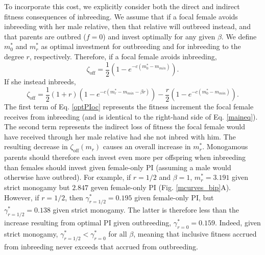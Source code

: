 \documentclass[10pt,letterpaper]{article}
\begin{document}
To incorporate this cost, we explicitly consider both the direct and indirect fitness consequences of inbreeding. We assume that if a focal female avoids inbreeding with her male relative, then that relative will outbreed instead, and that parents are outbred ($f=0$) and invest optimally for any given $\beta$. We define $m^{*}_{0}$ and $m^{*}_{r}$ as optimal investment for outbreeding and for inbreeding to the degree $r$, respectively. Therefore, if a focal female avoids inbreeding,
\begin{equation} \label{optPI}
\zeta_{\textrm{off}} = \frac{1}{2}\left(1-e^{-c\left(m^{*}_{0}-m_{min}\right)}\right).
\end{equation}
If she instead inbreeds,
\begin{equation} \label{optPIoc}
\zeta_{\textrm{off}} = \frac{1}{2}\left(1+r\right)\left(1-e^{-c\left(m^{*}_{r}-m_{min}-\beta r\right)}\right) - \frac{r}{2}\left(1-e^{-c\left(m^{*}_{0}-m_{min}\right)}\right).
\end{equation} 
The first term of Eq. \ref{optPIoc} represents the fitness increment the focal female receives from inbreeding (and is identical to the right-hand side of Eq. \ref{maineq}). The second term represents the indirect loss of fitness the focal female would have received through her male relative had she not inbred with him. The resulting decrease in $\zeta_{\textrm{off}}(m_{r})$ causes an overall increase in $m^{*}_{r}$. Monogamous parents should therefore each invest even more per offspring when inbreeding than females should invest given female-only PI (assuming a male would otherwise have outbred). For example, if $r=1/2$ and $\beta=1$, $m^{*}_{r}= 3.191$ given strict monogamy but $2.847$ geven female-only PI (Fig. \ref{mcurves_bip}A).  However, if $r=1/2$, then $\gamma^{*}_{r=1/2}=0.195$ given female-only PI, but $\gamma^{*}_{r=1/2}=0.138$ given strict monogamy. The latter is therefore less than the increase resulting from optimal PI given outbreeding, $\gamma^{*}_{r=0}=0.159$. Indeed, given strict monogamy, $\gamma^{*}_{r=1/2} < \gamma^{*}_{r=0}$ for all $\beta$, meaning that inclusive fitness accrued from inbreeding never exceeds that accrued from outbreeding. 
\end{document}
